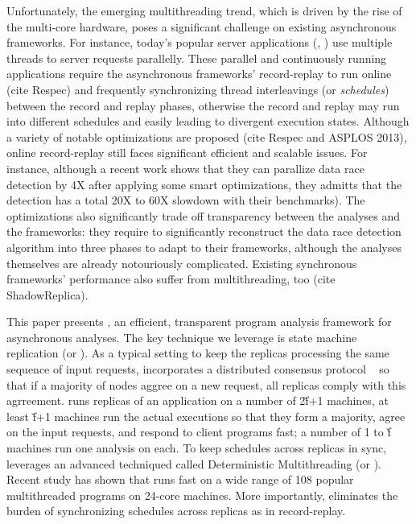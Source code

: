 Unfortunately, the emerging multithreading trend, which is driven by the rise 
of the multi-core hardware, poses a significant challenge on existing 
asynchronous frameworks. For instance, today's popular server applications 
(\eg, \apache) use multiple threads to server requests parallelly. These 
parallel and continuously running applications require the asynchronous 
frameworks' record-replay to run online (cite Respec) and frequently 
synchronizing thread interleavings (or \emph{schedules}) between the record and 
replay phases, otherwise the record and replay may run into different schedules 
and easily leading to divergent execution states. Although a variety of notable
optimizations are proposed (cite Respec and ASPLOS 2013), online record-replay 
still faces significant efficient and scalable issues. For instance, although a 
recent work shows that they can parallize data race detection by 4X after 
applying some smart optimizations, they admitts that the detection has a total 
20X to 60X slowdown with their benchmarks). The optimizations also 
significantly trade off transparency between the analyses and the frameworks: 
they require to significantly reconstruct the data race detection algorithm 
into three phases to adapt to their frameworks, although the analyses 
themselves are already notouriously complicated. Existing synchronous 
frameworks' performance also suffer from multithreading, too (cite 
ShadowReplica).


This paper presents \xxx, an efficient, transparent program 
analysis framework for asynchronous analyses. The key technique we leverage is 
state machine replication (or \smr). As a typical setting to keep the replicas 
processing the same sequence of input requests, \xxx incorporates a distributed 
consensus protocol \paxos~\cite{paxos} so that if a majority of nodes aggree on 
a new request, all replicas comply with this agrreement. \xxx runs replicas of 
an application on a number of 2\v{f}+1 machines, at least \v{f}+1 machines run 
the actual executions so that they form a majority, agree on the input 
requests, and respond to client programs fast; a number of 1 to \v{f} machines 
run one analysis on each. To keep schedules across replicas in sync, \repbox 
leverages an advanced techniqued called Deterministic Multithreading (or \dmt). 
Recent study has shown that \dmt runs fast on a wide range of 108 popular 
multithreaded programs on 24-core machines. More importantly, \dmt eliminates 
the burden of synchronizing schedules across replicas as in record-replay.


